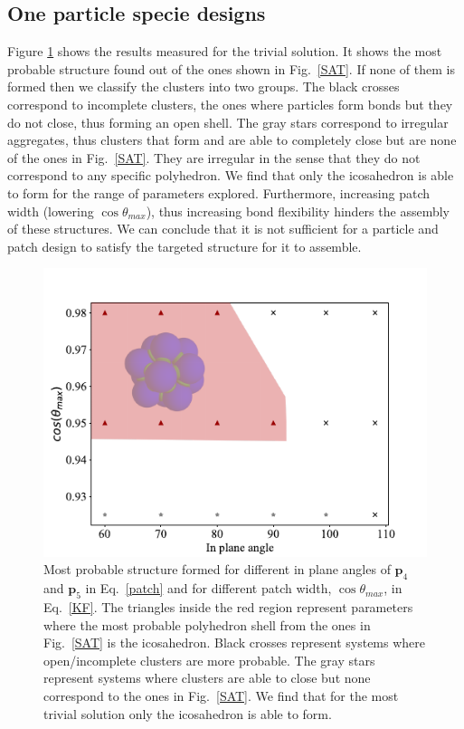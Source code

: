 \documentclass[a4paper, amsfonts, amssymb, amsmath, reprint, showkeys, nofootinbib, twoside]{revtex4-1}
\begin{document}
\subsection{One particle specie designs}

Figure \ref{N1c1} shows the results measured for the trivial solution. It shows the most probable structure found out of the ones shown in Fig.~\ref{SAT}. If none of them is formed then we classify the clusters into two groups. The black crosses correspond to incomplete clusters, the ones where particles form bonds but they do not close, thus forming an open shell. The gray stars correspond to irregular aggregates, thus clusters that form and are able to completely close but are none of the ones in Fig.~\ref{SAT}. They are irregular in the sense that they do not correspond to any specific polyhedron. We find that only the icosahedron is able to form for the range of parameters explored. Furthermore, increasing patch width (lowering $\cos\theta_{max}$), thus increasing bond flexibility hinders the assembly of these structures. We can conclude that it is not sufficient for a particle and patch design to satisfy the targeted structure for it to assemble.

\begin{figure}[t]
	\includegraphics{fig2.pdf}
	\caption{\label{N1c1} Most probable structure formed for different in plane angles of $\textbf{p}_4$ and $\textbf{p}_5$ in Eq.~\ref{patch} and for different patch width, $\cos\theta_{max}$, in Eq.~\ref{KF}. The triangles inside the red region represent parameters where the most probable polyhedron shell from the ones in Fig.~\ref{SAT} is the icosahedron. Black crosses represent systems where open/incomplete clusters are more probable. The gray stars represent systems where clusters are able to close but none correspond to the ones in Fig.~\ref{SAT}. We find that for the most trivial solution only the icosahedron is able to form.}
\end{figure}
\end{document}
